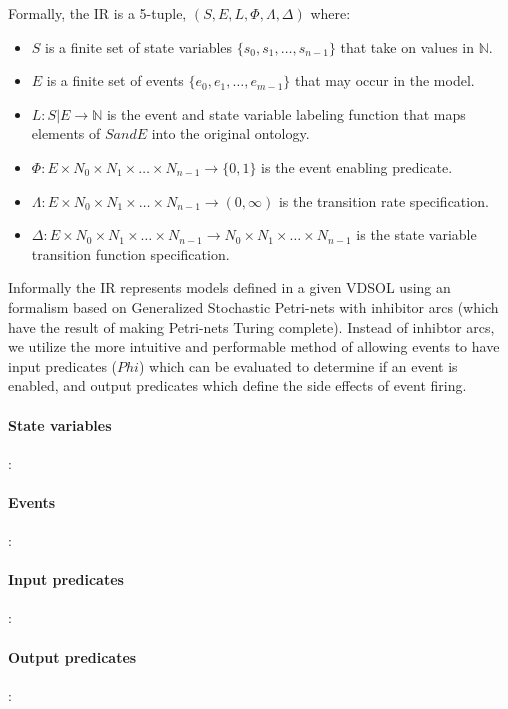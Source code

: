 \documentclass[11pt]{article}
\begin{document}
Formally, the IR is a 5-tuple, $(S, E, L, \Phi, \Lambda, \Delta)$ where:
\begin{itemize}
\item $S$ is a finite set of state variables $\{s_0, s_1, \ldots, s_{n-1}\}$ that take on values in $\mathbb{N}$.
\item $E$ is a finite set of events $\{e_0, e_1, \ldots, e_{m-1}\}$ that may occur in the model.
\item $L: S|E \rightarrow \mathbb{N}$ is the event and state variable labeling function that maps elements of $S and E$ into the original ontology.
\item $\Phi: E \times N_0 \times N_1 \times \ldots \times N_{n-1} \rightarrow \{0, 1\}$ is the event enabling predicate.
\item $\Lambda: E \times N_0 \times N_1 \times \ldots \times N_{n-1} \rightarrow (0, \infty)$ is the transition rate specification.
\item $\Delta: E \times N_0 \times N_1 \times \ldots \times N_{n-1} \rightarrow N_0 \times N_1 \times \ldots \times N_{n-1}$ is the state variable transition function specification.
\end{itemize}

Informally the IR represents models defined in a given VDSOL using an formalism based on Generalized Stochastic Petri-nets with inhibitor arcs (which have the result of making Petri-nets Turing complete).  Instead of inhibtor arcs, we utilize the more intuitive and performable method of allowing events to have input predicates ($Phi$) which can be evaluated to determine if an event is enabled, and output predicates which define the side effects of event firing.

\paragraph{State variables}:

\paragraph{Events}:

\paragraph{Input predicates}:

\paragraph{Output predicates}:
\end{document}

